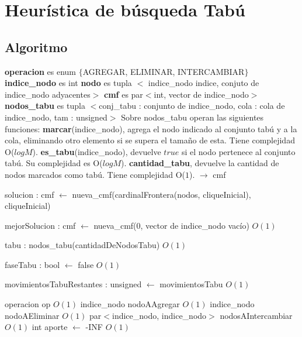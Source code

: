 \documentclass[a4paper, 10pt, twoside]{article}
\newenvironment{pseudo}[1][]{%
    \vspace{1em}%
    \begin{algorithmic}%
}
{%
    \end{algorithmic}%
    \vspace{1em}%
}
\newcommand{\Ode}[1]{\hfill $O(#1)$}
\begin{document}


\newpage

\section{Heurística de búsqueda Tabú}
\subsection{Algoritmo}

\begin{pseudo}

\State \textbf{operacion} es enum $\lbrace$AGREGAR, ELIMINAR, INTERCAMBIAR$\rbrace$
\State \textbf{indice\_nodo} es int
\State \textbf{nodo} es tupla $<$ indice\_nodo indice, conjuto de indice\_nodo adyacentes$>$
\State \textbf{cmf} es par$<$int, vector de indice\_nodo$>$
\State \textbf{nodos\_tabu} es  tupla $<$conj\_tabu : conjunto de indice\_nodo, cola : cola de indice\_nodo, tam : unsigned$>$
\State
\State Sobre nodos\_tabu operan las siguientes funciones:
\State \textbf{marcar}(indice\_nodo), agrega el nodo indicado al conjunto tabú y a la cola, eliminando otro elemento si se supera
el tamaño de esta. Tiene complejidad O($log M$).
\State \textbf{es\_tabu}(indice\_nodo), devuelve $true$ si el nodo pertenece al conjunto tabú. Su complejidad es O($log M$).
\State \textbf{cantidad\_tabu}, devuelve la cantidad de nodos marcados como tabú. Tiene complejidad O($1$).
\State
{} $\rightarrow$ cmf
	
	\State solucion : cmf $\leftarrow$ nueva\_cmf(cardinalFrontera(nodos, cliqueInicial), cliqueInicial)

	\State mejorSolucion : cmf $\leftarrow$ nueva\_cmf(0, vector de indice\_nodo vacío) 				\Ode{1}

	\State tabu : nodos\_tabu(cantidadDeNodosTabu) 													\Ode{1}

	\State faseTabu : bool $\leftarrow$ false 														\Ode{1}

	\State movimientosTabuRestantes : unsigned $\leftarrow$ movimientosTabu 						\Ode{1}


		\State operacion op 																		\Ode{1}
		\State indice\_nodo nodoAAgregar															\Ode{1}
		\State indice\_nodo nodoAEliminar															\Ode{1}
		\State par$<$indice\_nodo, indice\_nodo$>$ nodosAIntercambiar								\Ode{1}
		\State int aporte $\leftarrow$ -INF															\Ode{1}


\end{pseudo}
\end{document}
